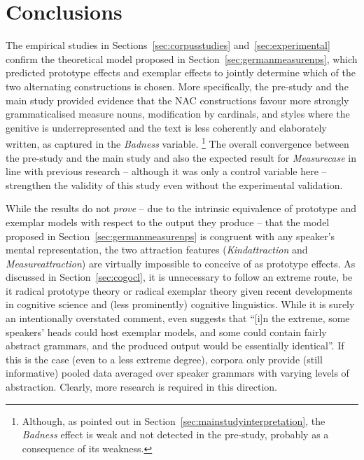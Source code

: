 \section{Conclusions}
\label{sec:conclusion}

The empirical studies in Sections~\ref{sec:corpusstudies} and~\ref{sec:experimental} confirm the theoretical model proposed in Section~\ref{sec:germanmeasurenps}, which predicted prototype effects and exemplar effects to jointly determine which of the two alternating constructions is chosen.
More specifically, the pre-study and the main study provided evidence that the NAC constructions favour more strongly grammaticalised measure nouns, modification by cardinals, and styles where the genitive is underrepresented and the text is less coherently and elaborately written, as captured in the \textit{Badness} variable.%
\footnote{Although, as pointed out in Section~\ref{sec:mainstudyinterpretation}, the \textit{Badness} effect is weak and not detected in the pre-study, probably as a consequence of its weakness.}
The overall convergence between the pre-study and the main study and also the expected result for \textit{Measurecase} in line with previous research \citep{Zimmer2015} -- although it was only a control variable here -- strengthen the validity of this study even without the experimental validation.

While the results do not \textit{prove} -- due to the intrinsic equivalence of prototype and exemplar models with respect to the output they produce -- that the model proposed in Section~\ref{sec:germanmeasurenps} is congruent with any speaker's mental representation, the two attraction features (\textit{Kindattraction} and \textit{Measureattraction}) are virtually impossible to conceive of as prototype effects.
As discussed in Section~\ref{sec:cogocl}, it is unnecessary to follow an extreme route, be it radical prototype theory or radical exemplar theory given recent developments in cognitive science and (less prominently) cognitive linguistics.
While it is surely an intentionally overstated comment, \citet[15]{Kapatsinski2014} even suggests that ``[i]n the extreme, some speakers’ heads could host exemplar models, and some could contain fairly abstract grammars, and the produced output would be essentially identical''.
If this is the case (even to a less extreme degree), corpora only provide (still informative) pooled data averaged over speaker grammars with varying levels of abstraction.
Clearly, more research is required in this direction.

